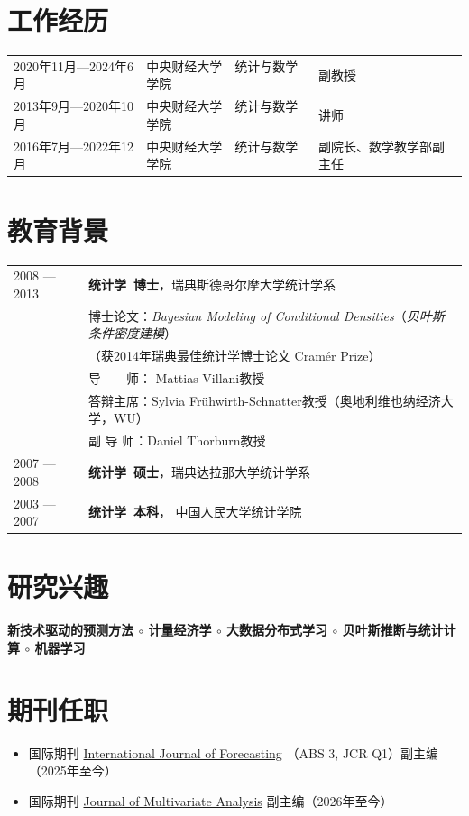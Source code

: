 \documentclass[twoside,a4paper,11pt]{article}
\begin{document}
\section{工作经历}

\begin{tabular}{lll}
2020年11月—2024年6月 & 中央财经大学　统计与数学学院 & 副教授 \\
2013年9月—2020年10月 & 中央财经大学　统计与数学学院 & 讲师    \\
2016年7月—2022年12月 & 中央财经大学　统计与数学学院 & 副院长、数学教学部副主任
\end{tabular}


\section{教育背景}

\begin{tabular}{ l  p{}}
  2008 --- 2013 & \textbf{统计学~博士}，瑞典斯德哥尔摩大学统计学系 \\
                & 博士论文：\emph{Bayesian Modeling of Conditional Densities}（\emph{贝叶斯条件密度建模}） \\
                & （获2014年瑞典最佳统计学博士论文 Cramér Prize） \\
                & 导　　师： Mattias Villani教授        \\
                & 答辩主席：Sylvia Frühwirth-Schnatter教授（奥地利维也纳经济大学，WU） \\
                & 副 导 师：Daniel Thorburn教授 \\
  2007 --- 2008 & \textbf{统计学~硕士}，瑞典达拉那大学统计学系 \\
  2003 --- 2007 & \textbf{统计学~本科}， 中国人民大学统计学院    \\
\end{tabular}

\section{研究兴趣}

\textbf{新技术驱动的预测方法 $\circ$  计量经济学 $\circ$ 大数据分布式学习 $\circ$ 贝叶斯推断与统计计算 $\circ$ 机器学习}

\section{期刊任职}
\begin{itemize}
\item 国际期刊 \href{https://www.sciencedirect.com/journal/international-journal-of-forecasting}{International Journal of Forecasting} （ABS 3, JCR Q1）副主编（2025年至今）

\item 国际期刊 \href{https://www.sciencedirect.com/journal/journal-of-multivariate-analysis}{Journal of Multivariate Analysis} 副主编（2026年至今）
\end{itemize}
\end{document}
